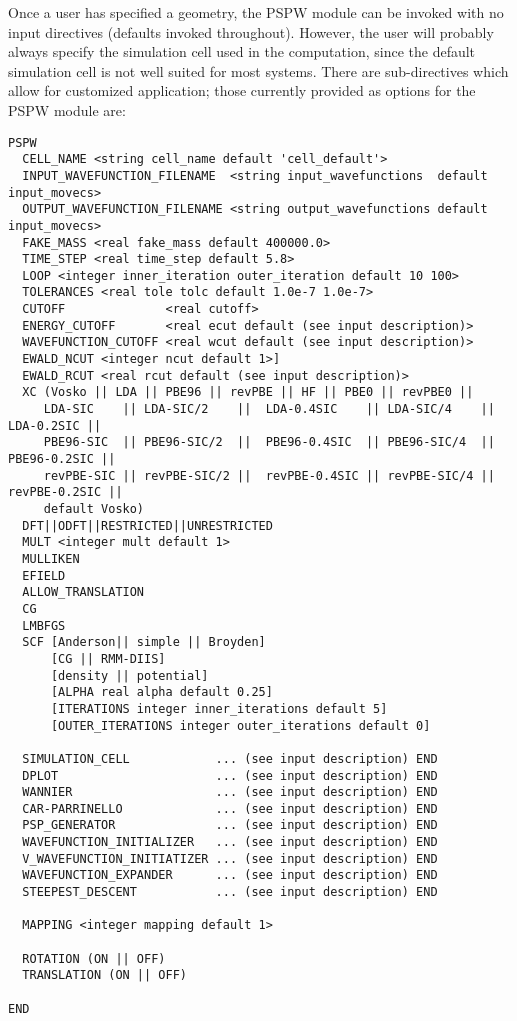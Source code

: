Once a user has specified a geometry, the PSPW module can be invoked
with no input  directives (defaults invoked throughout).  However, the
user will probably always specify the  simulation cell used in the
computation, since the default simulation cell is not well suited for
most systems.  There are sub-directives which allow for customized
application; those currently provided as options for the PSPW module are:
\begin{verbatim}
PSPW
  CELL_NAME <string cell_name default 'cell_default'>
  INPUT_WAVEFUNCTION_FILENAME  <string input_wavefunctions  default input_movecs>
  OUTPUT_WAVEFUNCTION_FILENAME <string output_wavefunctions default input_movecs>
  FAKE_MASS <real fake_mass default 400000.0>
  TIME_STEP <real time_step default 5.8>
  LOOP <integer inner_iteration outer_iteration default 10 100>
  TOLERANCES <real tole tolc default 1.0e-7 1.0e-7>
  CUTOFF              <real cutoff>
  ENERGY_CUTOFF       <real ecut default (see input description)>
  WAVEFUNCTION_CUTOFF <real wcut default (see input description)>
  EWALD_NCUT <integer ncut default 1>]
  EWALD_RCUT <real rcut default (see input description)>
  XC (Vosko || LDA || PBE96 || revPBE || HF || PBE0 || revPBE0 || 
     LDA-SIC    || LDA-SIC/2    ||  LDA-0.4SIC    || LDA-SIC/4    || LDA-0.2SIC ||
     PBE96-SIC  || PBE96-SIC/2  ||  PBE96-0.4SIC  || PBE96-SIC/4  || PBE96-0.2SIC ||
     revPBE-SIC || revPBE-SIC/2 ||  revPBE-0.4SIC || revPBE-SIC/4 || revPBE-0.2SIC ||
     default Vosko)
  DFT||ODFT||RESTRICTED||UNRESTRICTED
  MULT <integer mult default 1>
  MULLIKEN
  EFIELD
  ALLOW_TRANSLATION
  CG
  LMBFGS
  SCF [Anderson|| simple || Broyden] 
      [CG || RMM-DIIS]
      [density || potential] 
      [ALPHA real alpha default 0.25] 
      [ITERATIONS integer inner_iterations default 5]
      [OUTER_ITERATIONS integer outer_iterations default 0]

  SIMULATION_CELL            ... (see input description) END
  DPLOT                      ... (see input description) END
  WANNIER                    ... (see input description) END
  CAR-PARRINELLO             ... (see input description) END
  PSP_GENERATOR              ... (see input description) END
  WAVEFUNCTION_INITIALIZER   ... (see input description) END
  V_WAVEFUNCTION_INITIATIZER ... (see input description) END
  WAVEFUNCTION_EXPANDER      ... (see input description) END
  STEEPEST_DESCENT           ... (see input description) END

  MAPPING <integer mapping default 1>

  ROTATION (ON || OFF)
  TRANSLATION (ON || OFF)

END 
\end{verbatim}

